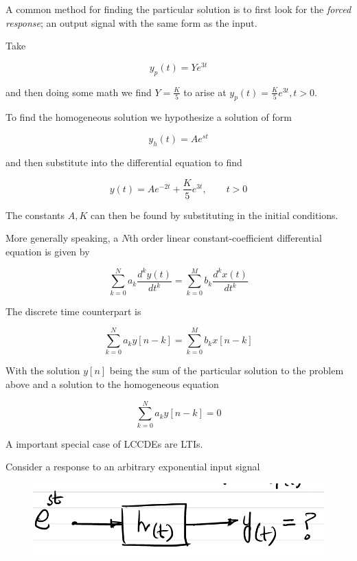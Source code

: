 \documentclass[../notes.tex]{subfiles}
\begin{document}
A common method for finding the particular solution is to first look for the \textit{forced response}; an output signal with the same form as the input.

Take 

\begin{equation}
	y_p(t) = Ye^{3t}
\end{equation}

and then doing some math we find $ Y = \frac{K}{5} $ to arise at $ y_p(t) = \frac{K}{5}e^{3t}, t > 0 $.

To find the homogeneous solution we hypothesize a solution of form

\begin{equation}
	y_h(t) = Ae^{st}
\end{equation}

and then substitute into the differential equation to find

\begin{equation}
	y(t) = Ae^{-2t} + \frac{K}{5} e^{3t}, \qquad t > 0
\end{equation}

The constants $ A, K$ can then be found by substituting in the initial conditions.



More generally speaking, a $ N $th order linear constant-coefficient differential equation is given by

\begin{equation}
	\sum^N_{k=0} a_k \frac{d^k y(t)}{dt^k} = \sum^{M}_{k=0} b_k \frac{d^k x(t)}{dt^k}
\end{equation}


The discrete time counterpart is

\begin{equation}
	\sum_{k=0}^{N} a_k y[n-k] = \sum_{k=0}^{M} b_k x[n-k]
\end{equation}

With the solution $ y[n] $ being the sum of the particular solution to the problem above and a solution to the homogeneous equation

\begin{equation}
	\sum_{k=0}^{N} a_k y[n-k] = 0
\end{equation}



A important special case of LCCDEs are LTIs.

Consider a response to an arbitrary exponential input signal

\begin{figure}[H]
	\centering
	\includegraphics[width=0.8\linewidth]{img/image_2022-11-02-16-16-38.png}
\end{figure}
\end{document}

